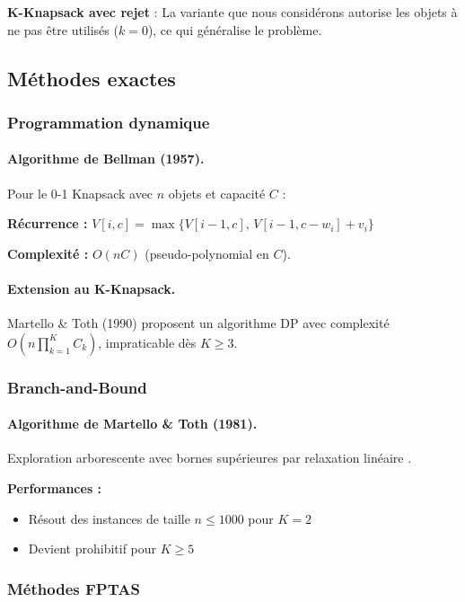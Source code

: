 \documentclass[12pt,a4paper]{article}
\theoremstyle{definition}
\theoremstyle{remark}
\begin{document}
\textbf{K-Knapsack avec rejet} : La variante que nous considérons autorise les objets à ne pas être utilisés ($k=0$), ce qui généralise le problème.

\subsection{Méthodes exactes}

\subsubsection{Programmation dynamique}

\paragraph{Algorithme de Bellman (1957).}
Pour le 0-1 Knapsack avec $n$ objets et capacité $C$ :

\textbf{Récurrence :} $V[i, c] = \max\{V[i-1, c], \, V[i-1, c-w_i] + v_i\}$

\textbf{Complexité :} $O(nC)$ (pseudo-polynomial en $C$).

\paragraph{Extension au K-Knapsack.}
Martello \& Toth (1990) \cite{martello1990knapsack} proposent un algorithme DP avec complexité $O(n \prod_{k=1}^K C_k)$, impraticable dès $K \geq 3$.

\subsubsection{Branch-and-Bound}

\paragraph{Algorithme de Martello \& Toth (1981).}
Exploration arborescente avec bornes supérieures par relaxation linéaire \cite{martello1981dynamic}.

\textbf{Performances :}
\begin{itemize}
    \item Résout des instances de taille $n \leq 1000$ pour $K = 2$
    \item Devient prohibitif pour $K \geq 5$
\end{itemize}

\subsubsection{Méthodes FPTAS}
\end{document}
